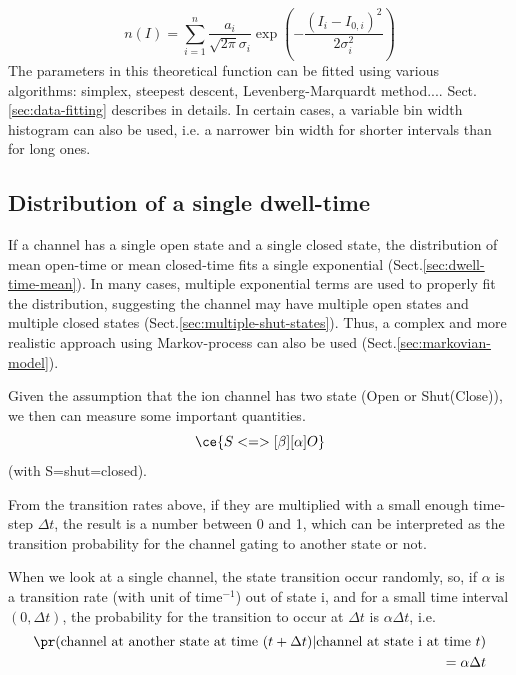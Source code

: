 \begin{equation}
  \label{eq:1}
  n(I) = \sum_{i=1}^n \frac{a_i}{\sqrt{2\pi}\sigma_i} \exp\left( -\frac{(I_i-I_{0,i})^2}{2\sigma_i^2}\right)
\end{equation}
The parameters in this theoretical function can be fitted using
various algorithms: simplex, steepest descent, Levenberg-Marquardt
method.... Sect. \ref{sec:data-fitting} describes in details.  In
certain cases, a variable bin width histogram can also be used, i.e. a
narrower bin width for shorter intervals than for long ones.



\subsection{Distribution of a single dwell-time}
 \label{sec:distribution_single_exponential}

If a channel has a single open state and a single closed state, the distribution
of mean open-time or mean closed-time fits a single exponential
(Sect.\ref{sec:dwell-time-mean}). In many cases, multiple exponential terms are
used to properly fit the distribution, suggesting the channel may have multiple
open states and multiple closed states (Sect.\ref{sec:multiple-shut-states}).
Thus, a complex and more realistic approach using Markov-process can also be
used (Sect.\ref{sec:markovian-model}).

Given the assumption that the ion channel has two state (Open or Shut(Close)),
we then can measure some important quantities.
\begin{equation}
\ce{S <=>[\beta][\alpha] O}
\end{equation}
(with S=shut=closed).

From the transition rates above, if they are multiplied with a small enough
time-step $\Delta t$, the result is a number between 0 and 1, which can be
interpreted as the  transition probability for the channel gating to another
state or not.

When we look at a single channel, the state transition occur randomly,
so, if $\alpha$ is a transition rate (with unit of time$^{-1}$) out of
state i, and for a small time interval $(0,\Delta t)$, the probability
for the transition to occur at $\Delta t$ is $\alpha \Delta t$, i.e.
\begin{equation}
  \label{eq:886}
  \begin{split}
    \pr(\text{channel at another state at time }(t+\Delta
    t)|\text{channel at
      state i at time }t) \\
    = \alpha\Delta t
  \end{split}
\end{equation}

